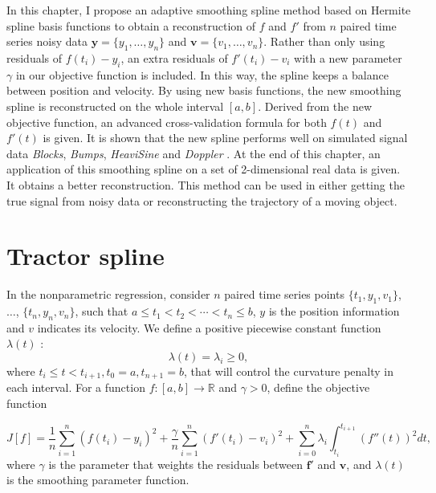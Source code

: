 In this chapter, I propose an adaptive smoothing spline method based on Hermite spline basis functions to obtain a reconstruction of $f$ and $f'$ from $n$ paired time series noisy data $\mathbf{y}=\{y_1,\ldots,y_n\}$ and $\mathbf{v}=\{v_1,\ldots,v_n\}$. Rather than only using residuals of $f(t_i)-y_i$, an extra residuals of $f'(t_i)-v_i$ with a new parameter $\gamma$ in our objective function is included. In this way, the spline keeps a balance between position and velocity. By using new basis functions, the new smoothing spline is reconstructed on the whole interval $[a,b]$. Derived from the new objective function, an advanced cross-validation formula for both $f(t)$ and $f'(t)$ is given. It is shown that the new spline performs well on simulated signal data \textit{Blocks}, \textit{Bumps}, \textit{HeaviSine} and \textit{Doppler} \cite{donoho1994ideal}. At the end of this chapter, an application of this smoothing spline on a set of 2-dimensional real data is given. It obtains a better reconstruction. This method can be used in either getting the true signal from noisy data or reconstructing the trajectory of a moving object. 


\section{Tractor spline}\label{SectionTractorSpline}


In the nonparametric regression, consider $n$ paired time series points $\{t_1,y_1,v_1\}$, $\ldots$, $\{t_n,y_n,v_n\}$, such that $a \leq t_1<t_2< \cdots < t_n \leq b$, $y$ is the position information and $v$ indicates its velocity. We define a positive piecewise constant function $\lambda(t)$ :
\begin{equation}
\lambda(t) = \lambda_i \geq 0,
\end{equation}
where $t_i \leq t<t_{i+1}, t_0=a, t_{n+1}=b$, that will control the curvature penalty in each interval. For a function $f:[a,b]\rightarrow \mathbb{R}$ and $\gamma>0$, define the objective function 

\begin{equation}\label{tractorsplineObjective}
J[f]= \frac{1}{n} \sum_{i=1}^{n} \left( f(t_i)-y_i \right)^2 + \frac{\gamma}{n} \sum_{i=1}^{n} \left( f'(t_i)-v_i \right)^2 +\sum_{i=0}^{n} \lambda_i\int_{t_i}^{t_{i+1}} \left( f''(t)\right)^2 dt,
\end{equation}
where $\gamma$ is the parameter that weights the residuals between $\mathbf{f}'$ and $\mathbf{v}$, and $\lambda(t)$ is the smoothing parameter function.

